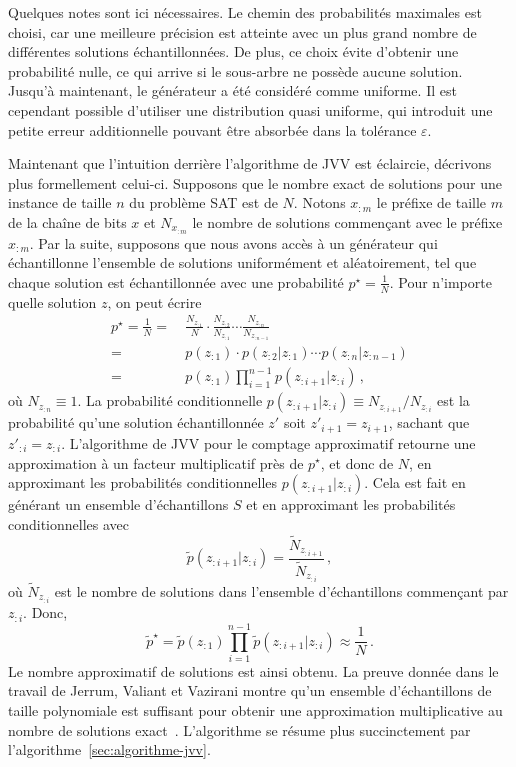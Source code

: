 Quelques notes sont ici nécessaires. Le chemin des probabilités maximales est choisi, car une meilleure précision est atteinte avec un plus grand nombre de différentes solutions échantillonnées. De plus, ce choix évite d'obtenir une probabilité nulle, ce qui arrive si le sous-arbre ne possède aucune solution. Jusqu'à maintenant, le générateur a été considéré comme uniforme. Il est cependant possible d'utiliser une distribution quasi uniforme, qui introduit une petite erreur additionnelle pouvant être absorbée dans la tolérance $\varepsilon$.

Maintenant que l'intuition derrière l'algorithme de JVV est éclaircie, décrivons plus formellement celui-ci. Supposons que le nombre exact de solutions pour une instance de taille $n$ du problème SAT est de $N$. Notons $x_{:m}$ le préfixe de taille $m$ de la chaîne de bits $x$ et $N_{x_{:m}}$ le nombre de solutions commençant avec le préfixe $x_{:m}$. Par la suite, supposons que nous avons accès à un générateur qui échantillonne l'ensemble de solutions uniformément et aléatoirement, tel que chaque solution est échantillonnée avec une probabilité $p^{\star} = \frac{1}{N}$. Pour n'importe quelle solution $z$, on peut écrire
\begin{equation}
    \begin{aligned}
        p^\star = \frac1N =&{\ } \frac{N_{z_{:1}}}{N} \cdot \frac{N_{z_{:2}}}{N_{z_{:1}}} \cdots \frac{N_{z_{:n}}}{N_{z_{:n-1}}} \\
        =&{\ } p(z_{:1}) \cdot p(z_{:2}|z_{:1}) \cdots p(z_{:n}|z_{:n-1}) \\
        =&{\ } p(z_{:1}) \prod_{i=1}^{n-1} p(z_{:i+1}|z_{:i}) \,,
    \end{aligned}
\end{equation}
où $N_{z_{:n}} \equiv 1$. La probabilité conditionnelle $p(z_{:i+1}|z_{:i}) \equiv N_{z_{:i+1}} / N_{z_{:i}}$ est la probabilité qu'une solution échantillonnée $z'$ soit $z'_{i+1} = z_{i+1}$, sachant que $z'_{:i} = z_{:i}$. L'algorithme de JVV pour le comptage approximatif retourne une approximation à un facteur multiplicatif près de $p^{\star}$, et donc de $N$, en approximant les probabilités conditionnelles $p(z_{:i+1}|z_{:i})$. Cela est fait en générant un ensemble d'échantillons $S$ et en approximant les probabilités conditionnelles avec
\begin{equation}
    \tilde p(z_{:i+1}|z_{:i}) = \frac{ \tilde N_{z_{:i+1}} }{ \tilde N_{z_{:i}} } \,,
\end{equation}
où $\tilde{N}_{z_{:i}}$ est le nombre de solutions dans l'ensemble d'échantillons commençant par $z_{:i}$. Donc,
\begin{equation}
    \tilde p^\star = \tilde p(z_{:1}) \prod_{i=1}^{n-1} \tilde p(z_{:i+1}|z_{:i}) \approx \frac1N \,.
\end{equation}
Le nombre approximatif de solutions est ainsi obtenu. La preuve donnée dans le travail de Jerrum, Valiant et Vazirani montre qu'un ensemble d'échantillons de taille polynomiale est suffisant pour obtenir une approximation multiplicative au nombre de solutions exact~\cite{jerrumRandomGenerationCombinatorial1986}. L'algorithme se résume plus succinctement par l'algorithme~\ref{sec:algorithme-jvv}.

